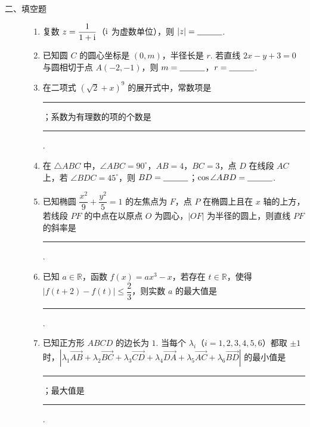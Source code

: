 \begin{description}

    \item[二、填空题]

    \begin{enumerate}[leftmargin=5pt]

      \addtocounter{enumi}{+10}

        \item 复数 \(z=\dfrac{1}{1+\mathrm{i}}\)（\(\mathrm{i}\) 为虚数单位），则 \(|z|=\rule[-0.3ex]{3em}{0.4pt}\).

        \item 已知圆 \(C\) 的圆心坐标是 \((0,m)\)，半径长是 \(r\). 若直线 \(2x-y+3=0\) 与圆相切于点 \(A(-2,-1)\)，则 \(m=\rule[-0.3ex]{3em}{0.4pt}\)，\(r=\rule[-0.3ex]{3em}{0.4pt}\).

        \item 在二项式 \((\sqrt2+x)^9\) 的展开式中，常数项是\rule[-0.3ex]{3em}{0.4pt}；系数为有理数的项的个数是\rule[-0.3ex]{3em}{0.4pt}.

        \item 在 \(\triangle ABC\) 中，\(\angle ABC=90^\circ\)，\(AB=4\)，\(BC=3\)，点 \(D\) 在线段 \(AC\) 上，若 \(\angle BDC=45^\circ\)，则 \(BD=\rule[-0.3ex]{3em}{0.4pt}\)；\(\cos\angle ABD=\rule[-0.3ex]{3em}{0.4pt}\).

        \item 已知椭圆 \(\dfrac{x^2}{9}+\dfrac{y^2}{5}=1\) 的左焦点为 \(F\)，点 \(P\) 在椭圆上且在 \(x\) 轴的上方，若线段 \(PF\) 的中点在以原点 \(O\) 为圆心，\(|OF|\) 为半径的圆上，则直线 \(PF\) 的斜率是\rule[-0.3ex]{3em}{0.4pt}.

        \item 已知 \(a\in\mathbb{R}\)，函数 \(f(x)=ax^3-x\)，若存在 \(t\in\mathbb{R}\)，使得 \(\left|f(t+2)-f(t)\right|\le\dfrac23\)，则实数 \(a\) 的最大值是\rule[-0.3ex]{3em}{0.4pt}.

        \item 已知正方形 \(ABCD\) 的边长为 \(1\). 当每个 \(\lambda_i\)（\(i=1,2,3,4,5,6\)）都取 \(\pm1\) 时，\(\left|\lambda_1\overrightarrow{AB}+\allowbreak\lambda_2\overrightarrow{BC}+\allowbreak\lambda_3\overrightarrow{CD}+\allowbreak\lambda_4\overrightarrow{DA}+\allowbreak\lambda_5\overrightarrow{AC}+\allowbreak\lambda_6\overrightarrow{BD}\right|\) 的最小值是\rule[-0.3ex]{3em}{0.4pt}；最大值是\rule[-0.3ex]{3em}{0.4pt}.

    \end{enumerate}

\end{description}

